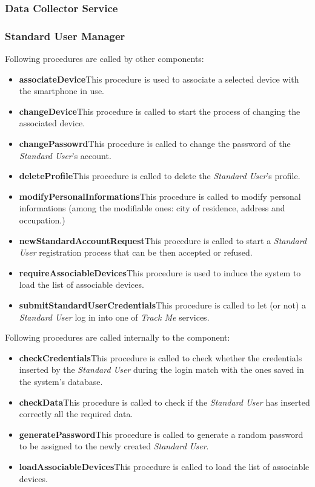 \subsubsection{Data Collector Service}

\subsubsection{Standard User Manager}
Following procedures are called by other components:
\begin{itemize}
  \item \textbf{associateDevice}\quad This procedure is used to associate a selected device with the smartphone in use.
  \item \textbf{changeDevice}\quad This procedure is called to start the process of changing the associated device.
  \item \textbf{changePassowrd}\quad This procedure is called to change the password of the \textit{Standard User}'s account.
  \item \textbf{deleteProfile}\quad This procedure is called to delete the \textit{Standard User}'s profile.
  \item \textbf{modifyPersonalInformations}\quad This procedure is called to modify personal informations (among the modifiable ones:  city of residence, address and occupation.)
  \item \textbf{newStandardAccountRequest}\quad This procedure is called to start a \textit{Standard User} registration process that can be then accepted or refused.
  \item \textbf{requireAssociableDevices}\quad This procedure is used to induce the system to load the list of associable devices.
  \item \textbf{submitStandardUserCredentials}\quad This procedure is called to let (or not) a \textit{Standard User} log in into one of \textit{Track Me} services.
\end{itemize}

\myparagraph{}
Following procedures are called internally to the component:
\begin{itemize}
  \item \textbf{checkCredentials}\quad This procedure is called to check whether the credentials inserted by the \textit{Standard User} during the login match with the ones saved in the system's database.
  \item \textbf{checkData}\quad This procedure is called to check if the \textit{Standard User} has inserted correctly all the required data.
  \item \textbf{generatePassword}\quad This procedure is called to generate a random password to be assigned to the newly created \textit{Standard User}.
  \item \textbf{loadAssociableDevices}\quad This procedure is called to load the list of associable devices.
\end{itemize}

